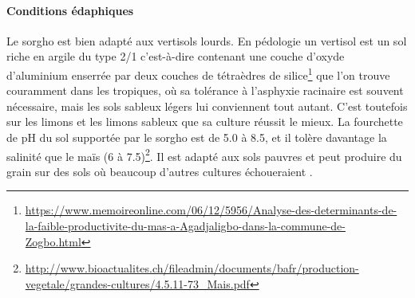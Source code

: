 \documentclass[a4paper,11pt]{article}
\begin{document}
\paragraph{Conditions édaphiques}
Le sorgho est bien adapté aux vertisols lourds. En pédologie un
vertisol est un sol riche en argile du type 2/1 c'est-à-dire contenant
une couche d'oxyde d'aluminium enserrée par deux couches de tétraèdres
de
silice\footnote{\url{https://www.memoireonline.com/06/12/5956/Analyse-des-determinants-de-la-faible-productivite-du-mas-a-Agadjaligbo-dans-la-commune-de-Zogbo.html}}
que l'on trouve couramment dans les tropiques, où sa tolérance à
l'asphyxie racinaire est souvent nécessaire, mais les sols sableux
légers lui conviennent tout autant. C'est toutefois sur les limons et
les limons sableux que sa culture réussit le mieux. La fourchette de
pH du sol supportée par le sorgho est de 5.0 à 8.5, et il tolère
davantage la salinité que le maïs (6 à
7.5)\footnote{\url{http://www.bioactualites.ch/fileadmin/documents/bafr/production-vegetale/grandes-cultures/4.5.11-73_Mais.pdf}}. Il
est adapté aux sols pauvres et peut produire du grain sur des sols où
beaucoup d'autres cultures échoueraient \cite{BARRO_KONDOMBO_2010}.
\end{document}
